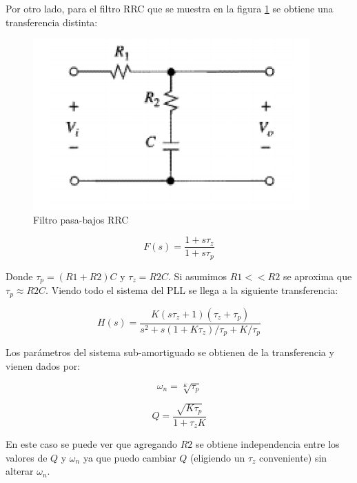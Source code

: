 \documentclass[10pt,a4paper]{article}
\begin{document}
Por otro lado, para el filtro RRC que se muestra en la figura \ref{fig:RRC} se obtiene una transferencia distinta:

\begin{figure}[hbtp]
	\centering
	\includegraphics[scale=1]{Imagenes/Filtro RRC.png}
	\caption{Filtro pasa-bajos RRC}
	\label{fig:RRC}
\end{figure}

\begin{equation}
	F(s)= \frac{1 + s \tau_z}{1 + s\tau_p}
	\label{eq:FRRC}
\end{equation}

Donde $\tau_p=(R1+R2)C $ y $\tau_z=R2C$. Si asumimos $R1<<R2$ se aproxima que $\tau_p \approx R2C$. Viendo todo el sistema del PLL se llega a la siguiente transferencia: 

\begin{equation}
	H(s) = \frac{K(s\tau_z +1)(\tau_z+\tau_p) }{ s^2 + s(1+K\tau_z)/\tau_p + K/\tau_p }
	\label{eq:TransRRC}
\end{equation}

Los parámetros del sistema sub-amortiguado se obtienen de la transferencia y vienen dados por:

\begin{equation}
	\omega_n = \sqrt[K]{\tau_p}
	\label{eq:omeganRRC}
\end{equation}

\begin{equation}
	Q = \frac{ \sqrt{K\tau_p} }{ 1 + \tau_z K }
	\label{eq:QRRC}
\end{equation}

En este caso se puede ver que agregando $R2$ se obtiene independencia entre los valores de $Q$ y $\omega_n$ ya que puedo cambiar $Q$ (eligiendo un $\tau_z$ conveniente) sin alterar $\omega_n$.
\end{document}
